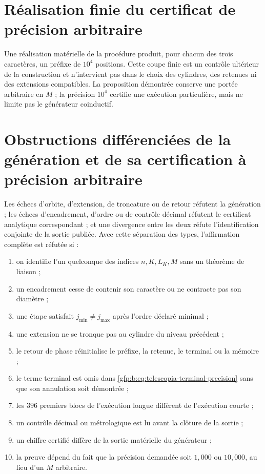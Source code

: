 \section{Réalisation finie du certificat de précision arbitraire}

Une réalisation matérielle de la procédure produit, pour chacun des trois caractères, un préfixe de \(10^4\) positions. Cette coupe finie est un contrôle ultérieur de la construction et n’intervient pas dans le choix des cylindres, des retenues ni des extensions compatibles. La proposition démontrée conserve une portée arbitraire en \(M\) ; la précision \(10^4\) certifie une exécution particulière, mais ne limite pas le générateur coinductif.

\section{Obstructions différenciées de la génération et de sa certification à précision arbitraire}

\begin{remark}
Les échecs d’orbite, d’extension, de troncature ou de retour réfutent la génération ;
les échecs d’encadrement, d’ordre ou de contrôle décimal réfutent le certificat
analytique correspondant ; et une divergence entre les deux réfute
l’identification conjointe de la sortie publiée. Avec cette séparation des types,
l’affirmation complète est réfutée si :
\begin{enumerate}
 \item on identifie l’un quelconque des indices \(n,K,L_K,M\) sans un
       théorème de liaison ;
 \item un encadrement cesse de contenir son caractère ou ne contracte pas son diamètre ;
 \item une étape satisfait \(j_{\min}\ne j_{\max}\) après l’ordre
       déclaré minimal ;
 \item une extension ne se tronque pas au cylindre du niveau précédent ;
 \item le retour de phase réinitialise le préfixe, la retenue, le terminal ou la mémoire ;
 \item le terme terminal est omis dans
       \eqref{gfp:b:eq:telescopia-terminal-precision} sans que son annulation soit démontrée ;
 \item les \(396\) premiers blocs de l’exécution longue diffèrent de
       l’exécution courte ;
 \item un contrôle décimal ou métrologique est lu avant la clôture de la sortie ;
 \item un chiffre certifié diffère de la sortie matérielle du générateur ;
 \item la preuve dépend du fait que la précision demandée soit \(1,000\) ou
       \(10,000\), au lieu d’un \(M\) arbitraire.
\end{enumerate}
\end{remark}

